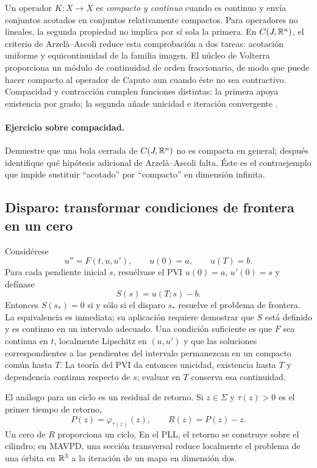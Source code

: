 Un operador \(K:X\to X\) es \emph{compacto y continuo} cuando
es continuo y envía conjuntos acotados en conjuntos relativamente compactos.
Para operadores no lineales, la segunda propiedad no implica por sí sola la
primera. En \(C(J,\mathbb{R}^n)\), el criterio de
Arzelà--Ascoli reduce esta comprobación a dos tareas: acotación uniforme y
equicontinuidad de la familia imagen. El núcleo de Volterra proporciona un
módulo de continuidad de orden fraccionario, de modo que puede hacer compacto
al operador de Caputo aun cuando éste no sea contractivo. Compacidad y
contracción cumplen funciones distintas: la primera apoya existencia por grado;
la segunda añade unicidad e iteración convergente
\cite{Deimling1985,Amster2021MetodosTopologicos}.

\ifHAFOPedagogy
\paragraph{Ejercicio sobre compacidad.}
Demuestre que una bola cerrada de \(C(J,\mathbb{R}^n)\) no es compacta en general;
después identifique qué hipótesis adicional de Arzelà--Ascoli falta. Éste es el
contraejemplo que impide sustituir ``acotado'' por ``compacto'' en dimensión
infinita.
\fi

\subsection{Disparo: transformar condiciones de frontera en un cero}

Considérese
\begin{equation}
 u''=F(t,u,u'),\qquad u(0)=a,\qquad u(T)=b.
 \label{eq:guide-shooting-bvp}
\end{equation}
Para cada pendiente inicial $s$, resuélvase el PVI
$u(0)=a$, $u'(0)=s$ y defínase
\begin{equation}
 S(s)=u(T;s)-b.
 \label{eq:guide-shooting-residual}
\end{equation}
Entonces $S(s_*)=0$ si y sólo si el disparo $s_*$ resuelve el problema de
frontera. La equivalencia es inmediata; su aplicación requiere demostrar que
$S$ está definido y es continuo en un intervalo adecuado.
Una condición suficiente es que $F$ sea continua en $t$, localmente
Lipschitz en $(u,u')$ y que las soluciones correspondientes a las
pendientes del intervalo permanezcan en un compacto común hasta $T$.
La teoría del PVI da entonces unicidad, existencia hasta $T$ y dependencia
continua respecto de $s$; evaluar en $T$ conserva esa continuidad.

El análogo para un ciclo es un residual de retorno. Si $z\in\Sigma$ y
$\tau(z)>0$ es el primer tiempo de retorno,
\begin{equation}
 P(z)=\varphi_{\tau(z)}(z),\qquad R(z)=P(z)-z.
 \label{eq:guide-return-residual}
\end{equation}
Un cero de $R$ proporciona un ciclo. En el PLL, el retorno se construye sobre
el cilindro; en MAVPD, una sección transversal reduce localmente el problema
de una órbita en $\mathbb{R}^3$ a la iteración de un mapa en dimensión dos.

